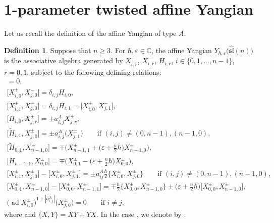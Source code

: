 \documentclass[pdftex]{sigma}
\numberwithin{equation}{section}
\theoremstyle{definition}
\newtheorem{Definition}[Theorem]{Definition}
\DeclareMathOperator{\ad}{ad}
\newcommand{\ve}{\varepsilon}
\begin{document}
\section{1-parameter twisted affine Yangian}\label{sec:4}
Let us recall the definition of the affine Yangian of type $A$.
\begin{Definition}\label{AAA}
Suppose that $n\geq3$. For $\hbar,\ve\in\mathbb{C}$, the affine Yangian $Y_{\hbar,\ve}\bigl(\widehat{\mathfrak{sl}}(n)\bigr)$ is the associative algebra generated by $X_{i,r}^{+}$, $X_{i,r}^{-}$, $H_{i,r}$, $i \in \{0,1,\dots, n-1\}$, $r = 0,1$, subject to the following defining relations:
\begin{gather*}
[H_{i,r}, H_{j,s}] = 0,\\
\bigl[X_{i,0}^{+}, X_{j,0}^{-}\bigr] = \delta_{i,j} H_{i, 0},\\
\bigl[X_{i,1}^{+}, X_{j,0}^{-}\bigr] = \delta_{i,j} H_{i, 1} = \bigl[X_{i,0}^{+}, X_{j,1}^{-}\bigr],\\
\bigl[H_{i,0}, X_{j,r}^{\pm}\bigr] = \pm a^A_{i,j} X_{j,r}^{\pm},\\
\bigl[\tilde{H}_{i,1}, X_{j,0}^{\pm}\bigr] = \pm a^A_{i,j}\bigl(X_{j,1}^{\pm}\bigr) \qquad \text{if }(i,j)\neq(0,n-1),(n-1,0),\\
\bigl[\tilde{H}_{0,1}, X_{n-1,0}^{\pm}\bigr] = \mp \biggl(X_{n-1,1}^{\pm}+\biggl(\ve+\frac{n}{2}\hbar\biggr) X_{n-1, 0}^{\pm}\biggr),\\
\bigl[\tilde{H}_{n-1,1}, X_{0,0}^{\pm}\bigr] = \mp \biggl(X_{0,1}^{\pm}-\biggl(\ve+\frac{n}{2}\hbar\biggr) X_{0, 0}^{\pm}\biggr),\\
\bigl[X_{i, 1}^{\pm}, X_{j, 0}^{\pm}\bigr] - \bigl[X_{i, 0}^{\pm}, X_{j, 1}^{\pm}\bigr] = \pm a^A_{ij}\frac{\hbar}{2} \bigl\{X_{i, 0}^{\pm}, X_{j, 0}^{\pm}\bigr\}\qquad \text{if }(i,j)\neq(0,n-1),(n-1,0),\\
\bigl[X_{0, 1}^{\pm}, X_{n-1, 0}^{\pm}\bigr] - \bigl[X_{0, 0}^{\pm}, X_{n-1, 1}^{\pm}\bigr]= \mp\frac{\hbar}{2} \bigl\{X_{0, 0}^{\pm}, X_{n-1, 0}^{\pm}\bigr\} + \biggl(\ve+\frac{n}{2}\hbar\biggr) \bigl[X_{0, 0}^{\pm}, X_{n-1, 0}^{\pm}\bigr],\\
\bigl(\ad X_{i,0}^{\pm}\bigr)^{1+|a^A_{i,j}|} \bigl(X_{j,0}^{\pm}\bigr)= 0 \qquad \text{if }i \neq j,
\end{gather*}
where  and $\{X,Y\}=XY+YX$. In the case \smash{$\ve=-\frac{n}{2}\hbar$}, we denote \smash{$Y_{\hbar,\ve}\bigl(\widehat{\mathfrak{sl}}(n)\bigr)$} by .
\end{Definition}
\end{document}

